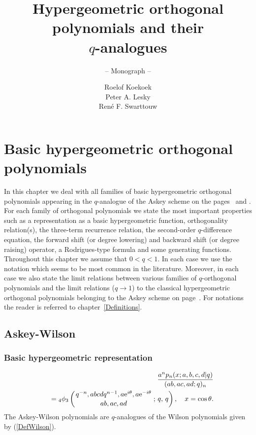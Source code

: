 \documentclass[envcountchap,graybox]{svmono}
\newcounter{rom}
\newcommand{\qhyp}[5]{\mbox{}_{#1}{\phi}_{#2}
\left(\genfrac{}{}{0pt}{}{#3}{#4}\,;\,q,\,#5\right)}
\newcommand{\e}{\textrm{e}}
\newcommand{\qhyp}[5]{\,\mbox{}_{#1}\phi_{#2}\!\left(
  \genfrac{}{}{0pt}{}{#3}{#4};#5\right)}
\begin{document}
\author{Roelof Koekoek\\[2.5mm]Peter A. Lesky\\[2.5mm]Ren\'e F. Swarttouw}
\title{Hypergeometric orthogonal polynomials and their\\$q$-analogues}
\subtitle{-- Monograph --}
\maketitle

\frontmatter

\large

\addtocounter{chapter}{13}

\chapter{Basic hypergeometric orthogonal polynomials}
\label{BasicHyperOrtPol}


In this chapter we deal with all families of basic hypergeometric orthogonal polynomials
appearing in the $q$-analogue of the Askey scheme on the pages~\pageref{qscheme1} and
\pageref{qscheme2}. For each family of orthogonal polynomials we state the most important
properties such as a representation as a basic hypergeometric function, orthogonality
relation(s), the three-term recurrence relation, the second-order $q$-difference equation,
the forward shift (or degree lowering) and backward shift (or degree raising) operator, a
Rodrigues-type formula and some generating functions. Throughout this chapter we assume
that $0<q<1$. In each case we use the notation which seems to be most common in the
literature. Moreover, in each case we also state the limit relations between various
families of $q$-orthogonal polynomials and the limit relations ($q\rightarrow 1$) to the
classical hypergeometric orthogonal polynomials belonging to the Askey scheme on
page~\pageref{scheme}. For notations the reader is referred to chapter~\ref{Definitions}.


\section{Askey-Wilson}

\subsection*{Basic hypergeometric representation}
\begin{eqnarray}
\label{DefAskeyWilson}
& &\frac{a^np_n(x;a,b,c,d|q)}{(ab,ac,ad;q)_n}\nonumber\\
& &{}=\qhyp{4}{3}{q^{-n},abcdq^{n-1},a\e^{i\theta},a\e^{-i\theta}}{ab,ac,ad}{q},\quad x=\cos\theta.
\end{eqnarray}
The Askey-Wilson polynomials are $q$-analogues of the Wilson polynomials given by (\ref{DefWilson}).
\end{document}
